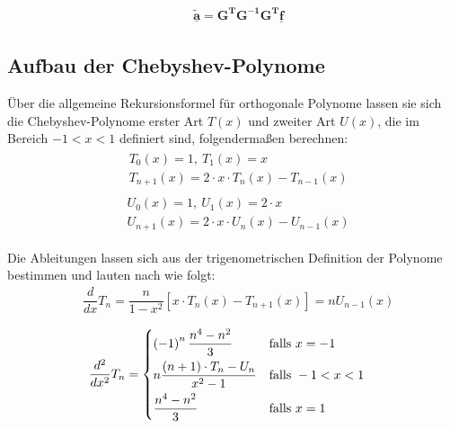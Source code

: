 \begin{align}
& \underline{\boldsymbol{\tilde{a}}} = \boldsymbol{G^TG^{-1}G^T}\underline{\boldsymbol{f}} 
\end{align}

\subsection{Aufbau der Chebyshev-Polynome}
Über die allgemeine Rekursionsformel für orthogonale Polynome \citep{Abramowitz-1972} lassen sie sich die Chebyshev-Polynome erster Art $T(x)$ und zweiter Art $U(x)$, die im Bereich $-1 < x < 1$ definiert sind, folgendermaßen berechnen:
\begin{align}
\begin{split}
& T_0(x) = 1, \: T_1(x) = x \\
& T_{n+1}(x) = 2 \cdot x \cdot T_n(x) - T_{n-1}(x)
\end{split}
\end{align} 
\begin{align}
\begin{split}
& U_0(x) = 1, \: U_1(x) = 2 \cdot x \\ 
& U_{n+1}(x) = 2 \cdot x \cdot U_n(x) - U_{n-1}(x)
\end{split}
\end{align}

Die Ableitungen lassen sich aus der trigenometrischen Definition der Polynome bestimmen und lauten nach \citet{spanier-1987} wie folgt:
\begin{align}
& \dfrac{d}{dx} T_n = \dfrac{n}{1-x^2} \left[ x \cdot T_n \left( x \right) - T_{n+1} \left( x \right) \right] = nU_{n-1} \left( x \right)
\end{align} 

\begin{align}
& \dfrac{d^2}{dx^2} T_n = 
  \begin{dcases} 
   \left(-1\right)^{n} \dfrac{n^4 - n^2}{3}  & \text{falls } x = -1 \\
   n \dfrac{(n+1) \cdot T_n - U_n}{x^2 - 1} & \text{falls } -1 < x < 1 \\
   \dfrac{n^4 - n^2}{3}                      & \text{falls } x = 1
  \end{dcases}
\end{align} 


